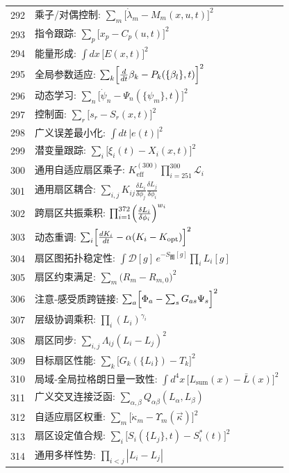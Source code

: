 \documentclass[11pt,a4paper]{article}
\begin{document}
\begin{longtable}{r l}
		292 & 乘子/对偶控制: $\sum_m\bigl[\dot\lambda_m - M_m(x,u,t)\bigr]^2$ \\
		293 & 指令跟踪: $\sum_p\bigl[x_p - C_p(u,t)\bigr]^2$ \\
		294 & 能量形成: $\int dx\,\bigl[E(x,t)\bigr]^2$ \\
		295 & 全局参数适应: $\sum_k\Bigl[\frac{d}{dt}\beta_k - P_k(\{\beta_l\},t)\Bigr]^2$ \\
		296 & 动态学习: $\sum_n\bigl[\dot\psi_n - \Psi_n(\{\psi_m\},t)\bigr]^2$ \\
		297 & 控制面: $\sum_r\bigl[s_r - S_r(x,t)\bigr]^2$ \\
		298 & 广义误差最小化: $\int dt\,|e(t)|^2$ \\
		299 & 潜变量跟踪: $\sum_i\bigl[\xi_i(t) - X_i(x,t)\bigr]^2$ \\
		300 & 通用自适应扇区乘子: $K^{(300)}_{\mathrm{eff}}\prod_{i=251}^{300}\mathcal{L}_i$ \\
		301 & 通用扇区耦合: $\sum_{i,j}K_{ij}\frac{\delta L_i}{\delta\phi_j}\frac{\delta L_j}{\delta\phi_i}$ \\
		302 & 跨扇区共振乘积: $\prod_{i=1}^{372}\Bigl(\frac{\delta L_i}{\delta\phi_i}\Bigr)^{w_i}$ \\
		303 & 动态重调: $\sum_i\Bigl[\frac{dK_i}{dt} - \alpha(K_i - K_{\text{opt}})\Bigr]^2$ \\
		304 & 扇区图拓扑稳定性: $\int\mathcal{D}[g]\,e^{-S_{\text{图}}[g]}\prod_i L_i[g]$ \\
		305 & 扇区约束满足: $\sum_m\bigl(R_m - R_{m,0}\bigr)^2$ \\
		306 & 注意‑感受质跨链接: $\sum_a\Bigl[\Phi_a - \sum_s G_{as}\Psi_s\Bigr]^2$ \\
		307 & 层级协调乘积: $\prod_i(L_i)^{\gamma_i}$ \\
		308 & 扇区同步: $\sum_{i,j}\Lambda_{ij}(L_i - L_j)^2$ \\
		309 & 目标扇区性能: $\sum_k\bigl[G_k(\{L_i\}) - T_k\bigr]^2$ \\
		310 & 局域‑全局拉格朗日量一致性: $\int d^4x\,\bigl[L_{\text{sum}}(x) - \bar L(x)\bigr]^2$ \\
		311 & 广义交叉连接泛函: $\sum_{\alpha,\beta}Q_{\alpha\beta}(L_\alpha,L_\beta)$ \\
		312 & 自适应扇区权重: $\sum_m\bigl[\dot\kappa_m - \Upsilon_m(\vec\kappa)\bigr]^2$ \\
		313 & 扇区设定值合规: $\sum_i\bigl[S_i(\{L_j\},t) - S_i^*(t)\bigr]^2$ \\
		314 & 通用多样性势: $\prod_{i<j}|L_i - L_j|$ \\

\end{longtable}
\end{document}
